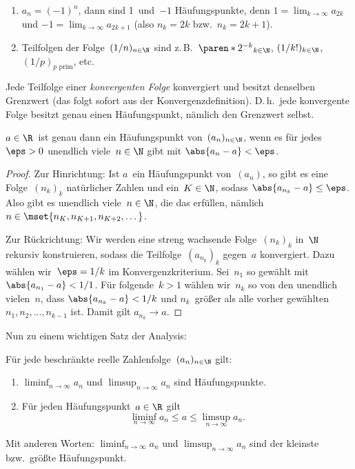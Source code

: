 \documentclass[a4paper]{article}
\begin{document}
\begin{example}\leavevmode
    \begin{enumerate}
        \item $a_n = (-1)^n$, dann sind 1~und~$-1$ Häufungspunkte, denn $1 = \lim_{k\to\infty} a_{2k}$ und $-1 = \lim_{k\to\infty} a_{2k+1}$ (also $n_k = 2k$ bzw.\ $n_k = 2k+1$).
        \item Teilfolgen der Folge~$(1/n)_{n\in\N}$ sind z.\,B.\ $\paren*{2^{-k}}_{k\in\N}$, $(1/k!)_{k\in\N}$, $(1/p)_{p\text{ prim}}$, etc.
    \end{enumerate}
\end{example}

\begin{remark}
    Jede Teilfolge einer \emph{konvergenten Folge} konvergiert und besitzt denselben Grenzwert (das folgt sofort aus der Konvergenzdefinition). D.\,h.\ jede konvergente Folge besitzt genau einen Häufungspunkt, nämlich den Grenzwert selbst.
\end{remark}

\begin{lemma}
    $a \in \R$~ist genau dann ein Häufungspunkt von~$(a_n)_{n\in\N}$, wenn es für jedes~$\eps > 0$ unendlich viele~$n \in \N$ gibt mit $\abs{a_n-a} < \eps$.
\end{lemma}

\begin{proof}
    Zur Hinrichtung: Ist $a$~ein Häufungspunkt von~$(a_n)$, so gibt es eine Folge~$(n_k)_k$ natürlicher Zahlen und ein~$K \in \N$, sodass $\abs{a_{n_k}-a} \leq \eps$. Also gibt es unendlich viele~$n \in \N$, die das erfüllen, nämlich $n \in \mset{n_K, n_{K+1}, n_{K+2}, \dots}$.

    Zur Rückrichtung: Wir werden eine streng wachsende Folge~$(n_k)_k$ in~$\N$ rekursiv konstruieren, sodass die Teilfolge~$(a_{n_k})_k$ gegen~$a$ konvergiert. Dazu wählen wir~$\eps = 1/k$ im Konvergenzkriterium. Sei~$n_1$ so gewählt mit $\abs{a_{n_1}-a} < 1/1$. Für folgende~$k > 1$ wählen wir~$n_k$ so von den unendlich vielen~$n$, dass $\abs{a_{n_k}-a} < 1/k$ und $n_k$~größer als alle vorher gewählten $n_1, n_2, \dots, n_{k-1}$ ist. Damit gilt $a_{n_k} \to a$.
\end{proof}

Nun zu einem wichtigen Satz der Analysis:

\begin{theorem}
    Für jede beschränkte reelle Zahlenfolge~$(a_n)_{n\in\N}$ gilt:
    \begin{enumerate}
        \item $\liminf_{n\to\infty} a_n$ und $\limsup_{n\to\infty} a_n$ sind Häufungspunkte.
        \item Für jeden Häufungspunkt~$a \in \R$ gilt
              \begin{equation*}
                  \liminf_{n\to\infty} a_n \leq a \leq \limsup_{n\to\infty} a_n.
              \end{equation*}
    \end{enumerate}
    Mit anderen Worten: $\liminf_{n\to\infty} a_n$ und $\limsup_{n\to\infty} a_n$ sind der kleinste bzw.\ größte Häufungspunkt.
\end{theorem}
\end{document}
